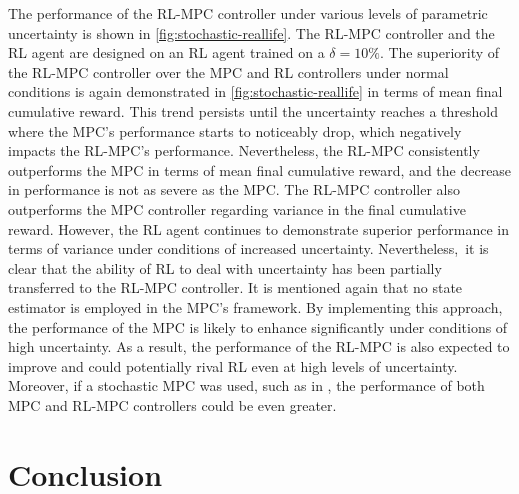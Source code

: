 The performance of the RL-MPC controller under various levels of parametric uncertainty is shown in \autoref{fig:stochastic-reallife}. The RL-MPC controller and the RL agent are designed on an RL agent trained on a $\delta = 10\%$. The superiority of the RL-MPC controller over the MPC and RL controllers under normal conditions is again demonstrated in \autoref{fig:stochastic-reallife} in terms of mean final cumulative reward. This trend persists  until the uncertainty reaches a threshold where the MPC's performance starts to noticeably drop, which negatively impacts the RL-MPC's performance. Nevertheless, the RL-MPC consistently outperforms the MPC in terms of mean final cumulative reward, and the decrease in performance is not as severe as the MPC. The RL-MPC controller also outperforms the MPC controller regarding variance in the final cumulative reward. However, the RL agent continues to demonstrate superior performance in terms of variance under conditions of increased uncertainty. Nevertheless, it is clear that the ability of RL to deal with uncertainty has been partially transferred to the RL-MPC controller. It is mentioned again that no state estimator is employed in the MPC's framework. By implementing this approach, the performance of the MPC is likely to enhance significantly under conditions of high uncertainty. As a result, the performance of the RL-MPC is also expected to improve and could potentially rival RL even at high levels of uncertainty. Moreover, if a stochastic MPC was used, such as in \citet{boersmaRobustSamplebasedModel2022}, the performance of both MPC and RL-MPC controllers could be even greater. 


\section{Conclusion}

